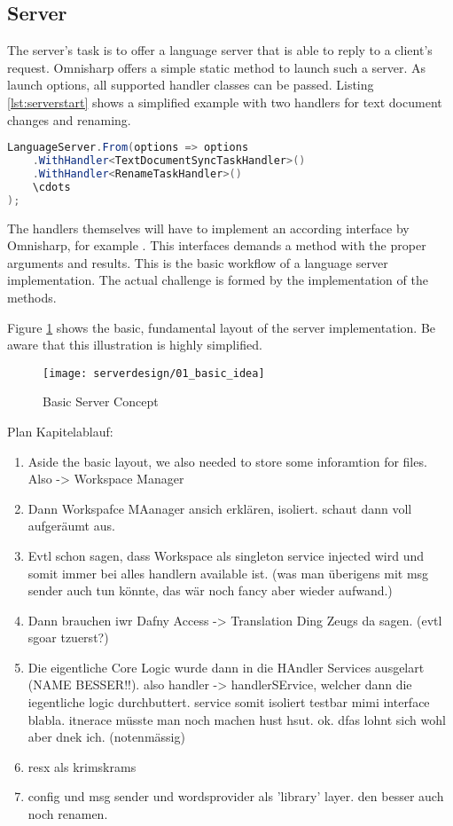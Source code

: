 \subsection{Server}
The server's task is to offer a language server that is able to reply to a client's request. Omnisharp offers a simple static method to launch such a server. As launch options, all supported handler classes can be passed. Listing \ref{lst:serverstart} shows a simplified example with two handlers for text document changes and renaming.

\begin{lstlisting}[language=csharp, caption={Language Server Initialization}, captionpos=b, label={lst:serverstart}]
LanguageServer.From(options => options
    .WithHandler<TextDocumentSyncTaskHandler>()
    .WithHandler<RenameTaskHandler>()
    \cdots
);
\end{lstlisting}


The handlers themselves will have to implement an according interface by Omnisharp, for example . This interfaces demands a  method with the proper arguments and results. This is the basic workflow of a language server implementation. The actual challenge is formed by the implementation of the  methods.

Figure \ref{fig:server_basic_idea} shows the basic, fundamental layout of the server implementation. Be aware that this illustration is highly simplified.

\begin{figure}[H]
    \centering
    \texttt{[image: serverdesign/01\_basic\_idea]}
    \caption{Basic Server Concept}
    \label{fig:server_basic_idea}
\end{figure}

Plan Kapitelablauf:
\begin{enumerate}
    \item Aside the basic layout, we also needed to store some inforamtion for files. Also -> Workspace Manager
    \item Dann Workspafce MAanager ansich erklären, isoliert. schaut dann voll aufgeräumt aus.
    \item Evtl schon sagen, dass Workspace als singleton service injected wird und somit immer bei alles handlern available ist. (was man überigens mit msg sender auch tun könnte, das wär noch fancy aber wieder aufwand.)
    \item Dann brauchen iwr Dafny Access -> Translation Ding Zeugs da sagen. (evtl sgoar tzuerst?)
    \item Die eigentliche Core Logic wurde dann in die HAndler Services ausgelart (NAME BESSER!!). also handler -> handlerSErvice, welcher dann die iegentliche logic durchbuttert. service somit isoliert testbar mimi interface blabla. itnerace müsste man noch machen hust hsut. ok. dfas lohnt sich wohl aber dnek ich. (notenmässig)
    \item resx als krimskrams
    \item config und msg sender und wordsprovider als 'library' layer. den besser auch noch renamen.
\end{enumerate}

